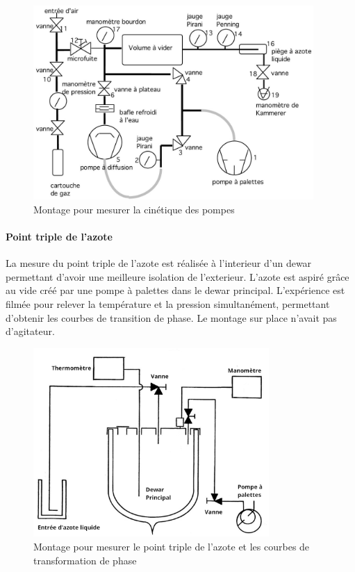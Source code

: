 \begin{figure}[h]
    \centering
    \includegraphics[width=0.95\textwidth]{figures/montage_cinetique.png}
    \caption{Montage pour mesurer la cinétique des pompes}
    \label{fig:montagecinetique}
\end{figure}


\paragraph*{Point triple de l'azote}
La mesure du point triple de l'azote est réalisée à l'interieur d'un dewar permettant d'avoir une meilleure isolation de l'exterieur. L'azote est aspiré grâce au vide créé par une pompe à palettes dans le dewar principal. L'expérience est filmée pour relever la température et la pression simultanément, permettant d'obtenir les courbes de transition de phase. Le montage sur place n'avait pas d'agitateur.

\begin{figure}[h]
    \centering
    \includegraphics[width=0.8\textwidth]{figures/montage_point_triple.png}
    \caption{Montage pour mesurer le point triple de l'azote et les courbes de transformation de phase}
    \label{fig:montagepointtriple}
\end{figure}
